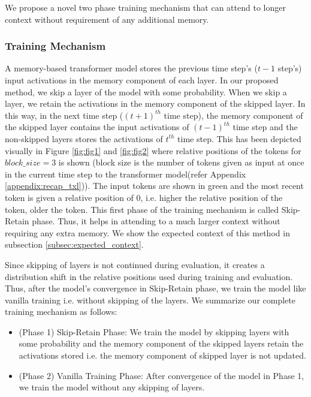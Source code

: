 \documentclass[11pt]{article}
\begin{document}
We propose a novel two phase training mechanism that can attend to longer context without requirement of any additional memory.

\subsubsection{Training Mechanism}

A memory-based transformer model stores the previous time step's ($t-1$ step's) input activations in the memory component of each layer. In our proposed method, we skip a layer of the model with some probability. When we skip a layer, we retain the activations in the memory component of the skipped layer. In this way, in the next time step ($(t+1)^{th}$ time step), the memory component of the skipped layer contains the input activations of $(t-1)^{th}$ time step and the non-skipped layers stores the activations of ${t}^{th}$ time step. This has been depicted visually in Figure \ref{fig:fig1} and \ref{fig:fig2} where relative positions of the tokens for $block\_size=3$ is shown (block size is the number of tokens given as input at once in the current time step to the transformer model(refer Appendix \ref{appendix:recap_txl})). The input tokens are shown in green and the most recent token is given a relative position of $0$, i.e. higher the relative position of the token, older the token. This first phase of the training mechanism is called Skip-Retain phase. Thus, it helps in attending to a much larger context without requiring any extra memory. We show the expected context of this method in subsection \ref{subsec:expected_context}.










Since skipping of layers is not continued during evaluation, it creates a distribution shift in the relative positions used during training and evaluation. Thus, after the model's convergence in Skip-Retain phase, we train the model like vanilla training i.e. without skipping of the layers. We summarize our complete training mechanism as follows: \\
\begin{itemize}
    \item (Phase 1) Skip-Retain Phase: We train the model by skipping layers with some probability and the memory component of the skipped layers retain the activations stored i.e. the memory component of skipped layer is not updated.
    \item (Phase 2) Vanilla Training Phase: After convergence of the model in Phase 1, we train the model without any skipping of layers.
\end{itemize}
\end{document}

